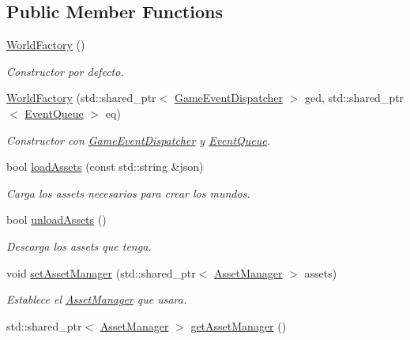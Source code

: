 \subsection*{Public Member Functions}
\begin{DoxyCompactItemize}
\item 
\hyperlink{classant_1_1_world_factory_a14b0c1669fe73a6773fcdc16478260d1}{World\+Factory} ()
\begin{DoxyCompactList}\small\item\em Constructor por defecto. \end{DoxyCompactList}\item 
\hyperlink{classant_1_1_world_factory_ae3d047fa97001b82fc87ae13bd9d91e8}{World\+Factory} (std\+::shared\+\_\+ptr$<$ \hyperlink{classant_1_1_game_event_dispatcher}{Game\+Event\+Dispatcher} $>$ ged, std\+::shared\+\_\+ptr$<$ \hyperlink{classant_1_1_event_queue}{Event\+Queue} $>$ eq)
\begin{DoxyCompactList}\small\item\em Constructor con \hyperlink{classant_1_1_game_event_dispatcher}{Game\+Event\+Dispatcher} y \hyperlink{classant_1_1_event_queue}{Event\+Queue}. \end{DoxyCompactList}\item 
bool \hyperlink{classant_1_1_world_factory_a45e1b16aef0eeac9b09cb2b3a342f302}{load\+Assets} (const std\+::string \&json)
\begin{DoxyCompactList}\small\item\em Carga los assets necesarios para crear los mundos. \end{DoxyCompactList}\item 
bool \hyperlink{classant_1_1_world_factory_aa5883b005670e04006465ec2d2f58dfa}{unload\+Assets} ()
\begin{DoxyCompactList}\small\item\em Descarga los assets que tenga. \end{DoxyCompactList}\item 
void \hyperlink{classant_1_1_world_factory_a10517a2948309249fd48d9a977531d90}{set\+Asset\+Manager} (std\+::shared\+\_\+ptr$<$ \hyperlink{classant_1_1_asset_manager}{Asset\+Manager} $>$ assets)
\begin{DoxyCompactList}\small\item\em Establece el \hyperlink{classant_1_1_asset_manager}{Asset\+Manager} que usara. \end{DoxyCompactList}\item 
std\+::shared\+\_\+ptr$<$ \hyperlink{classant_1_1_asset_manager}{Asset\+Manager} $>$ \hyperlink{classant_1_1_world_factory_a42d36e353537dad2ab9069d8ce8bb99d}{get\+Asset\+Manager} ()

\end{DoxyCompactItemize}

